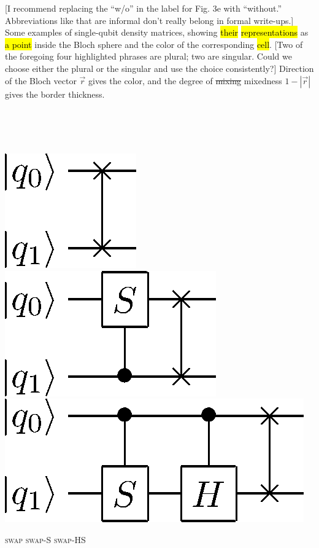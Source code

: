 \documentclass[11pt]{article}
\newcommand{\nicole}[1]{{\color{Green}#1}}
\newenvironment{Figure}{\par\medskip\noindent\minipage{\linewidth}}{\endminipage\par\medskip}
\begin{document}
\begin{multicols}{2}
\begin{Figure}
{{[I recommend replacing the ``w/o'' in  the label for Fig. 3e with ``without.'' Abbreviations like that are informal don't really belong in formal write-ups.]}
Some examples of single-qubit density matrices\nicole{,} showing \hl{their} \hl{representations} as \hl{a point} inside the Bloch sphere and the color of the corresponding \hl{cell}. \nicole{[Two of the foregoing four highlighted phrases are plural; two are singular. Could we choose either the plural or the singular and use the choice consistently?]}
Direction of the Bloch vector $\vec r$ gives the color, and the degree of \sout{mixing} \nicole{mixedness} $1 - |\vec r|$ gives the border thickness.}
\end{Figure}

\hspace{1cm}\\
\hspace{1cm}\\
\hspace{1cm}\\


\begin{Figure}
\centering

\includegraphics[height=0.15\textwidth]{Images/circuits/U2.png}
\hspace{4mm}
\includegraphics[height=0.15\textwidth]{Images/circuits/U2-S.png}
\hspace{4mm}
\includegraphics[height=0.15\textwidth]{Images/circuits/trails.png}

\textsc{swap}\hspace{1cm}
\textsc{swap-S}\hspace{1.5cm}
\textsc{swap-HS}
\vspace{5mm}


\end{Figure}
\end{multicols}
\end{document}
